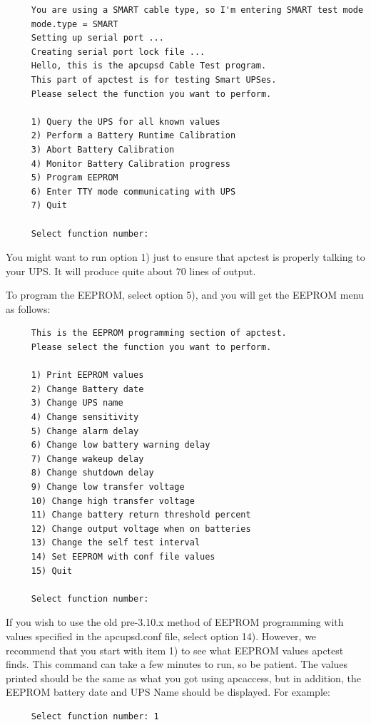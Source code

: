 {{{{{{\begin{verbatim}
     You are using a SMART cable type, so I'm entering SMART test mode
     mode.type = SMART
     Setting up serial port ...
     Creating serial port lock file ...
     Hello, this is the apcupsd Cable Test program.
     This part of apctest is for testing Smart UPSes.
     Please select the function you want to perform.
     
     1) Query the UPS for all known values
     2) Perform a Battery Runtime Calibration
     3) Abort Battery Calibration
     4) Monitor Battery Calibration progress
     5) Program EEPROM
     6) Enter TTY mode communicating with UPS
     7) Quit
     
     Select function number:
\end{verbatim}
\normalsize

You might want to run option 1) just to ensure that apctest is properly
talking to your UPS. It will produce quite about 70 lines of output.  

To program the EEPROM, select option 5), and you will get the EEPROM menu as
follows: 

\footnotesize
\begin{verbatim}
     This is the EEPROM programming section of apctest.
     Please select the function you want to perform.
     
     1) Print EEPROM values
     2) Change Battery date
     3) Change UPS name
     4) Change sensitivity
     5) Change alarm delay
     6) Change low battery warning delay
     7) Change wakeup delay
     8) Change shutdown delay
     9) Change low transfer voltage
     10) Change high transfer voltage
     11) Change battery return threshold percent
     12) Change output voltage when on batteries
     13) Change the self test interval
     14) Set EEPROM with conf file values
     15) Quit
     
     Select function number:
\end{verbatim}
\normalsize

If you wish to use the old pre-3.10.x method of EEPROM programming with values
specified in the apcupsd.conf file, select option 14). However, we recommend
that you start with item 1) to see what EEPROM values apctest finds. This
command can take a few minutes to run, so be patient. The values printed
should be the same as what you got using apcaccess, but in addition, the
EEPROM battery date and UPS Name should be displayed. For example: 

\footnotesize
\begin{verbatim}
     Select function number: 1
     

\end{verbatim}}}}}}}
